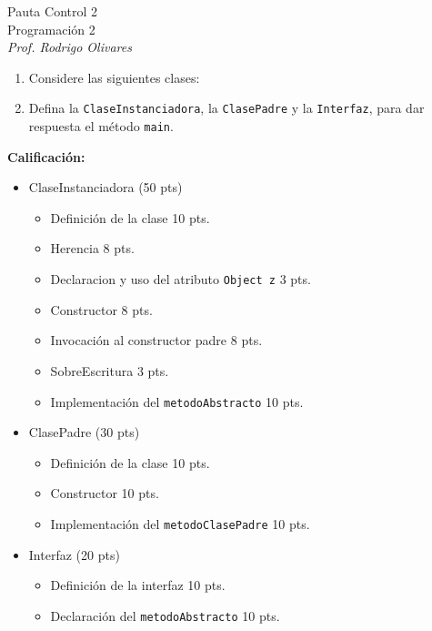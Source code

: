 \documentclass[10pt]{article}
\begin{document}
\begin{center}
	{\Large Pauta Control 2}\\
    Programaci\'on 2 \\
	\emph{\small Prof. Rodrigo Olivares} \\
\end{center}

\begin{enumerate}
    \item[ ] Considere las siguientes clases:
    \begin{center}
        
    \end{center}    
    \begin{center}
        
    \end{center}    
    \item[] Defina la \texttt{ClaseInstanciadora}, la \texttt{ClasePadre} y la \texttt{Interfaz}, para dar respuesta el m\'etodo \texttt{main}.
\end{enumerate}
\textbf{Calificaci\'on:}
\begin{itemize}
\item ClaseInstanciadora (50 pts)
\begin{itemize}
\item Definici\'on de la clase 10 pts.
\item Herencia 8 pts.
\item Declaracion y uso del atributo \texttt{Object z} 3 pts.
\item Constructor 8 pts.
\item Invocaci\'on al constructor padre 8 pts.
\item SobreEscritura 3 pts.
\item Implementaci\'on del \texttt{metodoAbstracto} 10 pts.
\end{itemize}
\item ClasePadre (30 pts)
\begin{itemize}
\item Definici\'on de la clase 10 pts.
\item Constructor 10 pts.
\item Implementaci\'on del \texttt{metodoClasePadre} 10 pts.
\end{itemize}
\item Interfaz (20 pts)
\begin{itemize}
\item Definici\'on de la interfaz 10 pts.
\item Declaraci\'on del \texttt{metodoAbstracto} 10 pts.
\end{itemize}
\end{itemize}
\newpage



\end{document}
